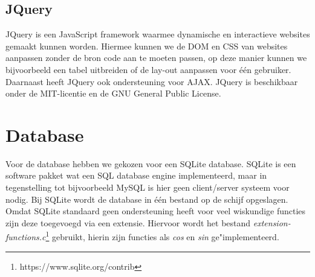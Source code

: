 \documentclass[twoside,openright]{uva-bachelor-thesis}
\begin{document}
		\subsection{JQuery}
		JQuery is een JavaScript framework waarmee dynamische en interactieve websites gemaakt kunnen worden. Hiermee kunnen we de DOM en CSS van websites aanpassen zonder de bron code aan te moeten passen, op deze manier kunnen we bijvoorbeeld een tabel uitbreiden of de lay-out aanpassen voor \'e\'en gebruiker. Daarnaast heeft JQuery ook ondersteuning voor AJAX. JQuery is beschikbaar onder de MIT-licentie en de GNU General Public License.
	\section{Database}
		\label{sec:db}
		Voor de database hebben we gekozen voor een SQLite \cite{SQLite} database. SQLite is een software pakket wat een SQL database engine implementeerd, maar in tegenstelling tot bijvoorbeeld MySQL is hier geen client/server systeem voor nodig. Bij SQLite wordt de database in \'e\'en bestand op de schijf opgeslagen.
		\\[0.5cm]
		Omdat SQLite standaard geen ondersteuning heeft voor veel wiskundige functies zijn deze toegevoegd via een extensie. Hiervoor wordt het bestand \textit{extension-functions.c}\footnote{https://www.sqlite.org/contrib} gebruikt, hierin zijn functies als \textit{cos} en \textit{sin} ge"implementeerd.
\end{document}
